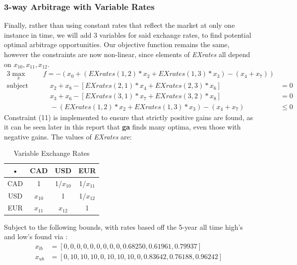 \documentclass[12pt]{article}
\begin{document}
\subsubsection{3-way Arbitrage with Variable Rates}
\label{xguess}
Finally, rather than using constant rates that reflect the market at only one instance in time, we will add 3 variables for said exchange rates, to find potential optimal arbitrage opportunities.  Our objective function remains the same, however the constraints are now non-linear, since elements of \textit{EXrates} all depend on $x_{10},x_{11},x_{12}$.
\begin{alignat}{3}
\max_x &\quad  f = -(x_{0} + (EXrates(1,2)*x_{2} + EXrates(1,3)*x_{3}) - (x_{4} + x_{7}))  &\\
\text{subject to: }  &\quad\quad x_{2} + x_{8} - [EXrates(2,1)*x_{4} + EXrates(2,3)*x_{6}] &  = 0 \\
 & \quad\quad   x_{3} + x_{6} - [EXrates(3,1)*x_{7} + EXrates(3,2)*x_{8}] & = 0 \\
 & \quad\quad   -(EXrates(1,2)*x_{2} + EXrates(1,3)*x_{3}) - (x_{4} + x_{7}) & \leq 0
\end{alignat}
Constraint (11) is implemented to ensure that strictly positive gains are found, as it can be seen later in this report that \textbf{ga} finds many optima, even those with negative gains. The values of \textit{EXrates} are:
\begin{table}[H]
\centering
\begin{tabular}{|c|c|c|c|}
\hline 
• & CAD & USD & EUR \\ 
\hline 
CAD & 1 & 1/$x_{10}$ & 1/$x_{11}$ \\ 
\hline 
USD & $x_{10}$ & 1 & 1/$x_{12}$ \\ 
\hline 
EUR & $x_{11}$ & $x_{12}$ & 1 \\ 
\hline 
\end{tabular} 
\caption{Variable Exchange Rates}
\label{tab:ratesVar}
\end{table}
Subject to the following bounds, with rates based off the 5-year all time high's and low's found via \cite{xe}:
\begin{equation}
\begin{split}
x_{lb} & = [0,0,0,0,0,0,0,0,0,0.68250,0.61961,0.79937]\\
x_{ub} & = [0,10,10,10,0,10,10,10,0,0.83642,0.76188,0.96242]
\end{split}
\end{equation}
\end{document}
